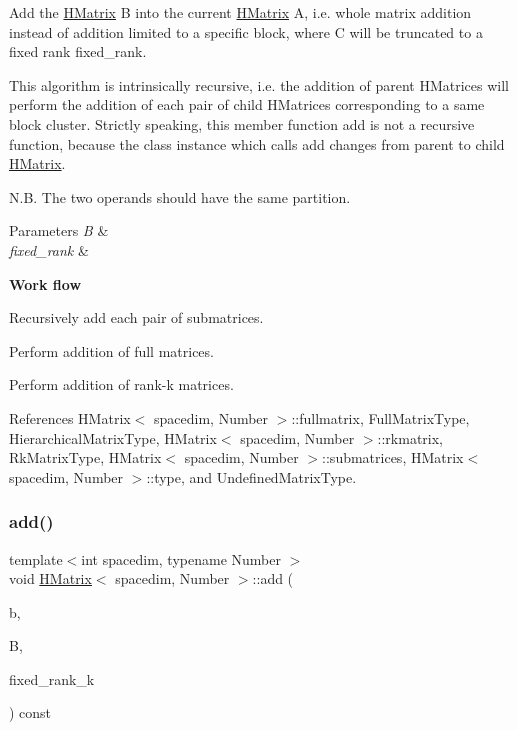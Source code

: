 Add the \hyperlink{classHMatrix}{H\+Matrix} {\ttfamily B} into the current \hyperlink{classHMatrix}{H\+Matrix} {\ttfamily A}, i.\+e. whole matrix addition instead of addition limited to a specific block, where {\ttfamily C} will be truncated to a fixed rank {\ttfamily fixed\+\_\+rank}.

This algorithm is intrinsically recursive, i.\+e. the addition of parent H\+Matrices will perform the addition of each pair of child H\+Matrices corresponding to a same block cluster. Strictly speaking, this member function {\ttfamily add} is not a recursive function, because the class instance which calls {\ttfamily add} changes from parent to child \hyperlink{classHMatrix}{H\+Matrix}.

N.\+B. The two operands should have the same partition.


\begin{DoxyParams}{Parameters}
{\em B} & \\
\hline
{\em fixed\+\_\+rank} & \\
\hline
\end{DoxyParams}
{\bfseries Work flow}

Recursively add each pair of submatrices.

Perform addition of full matrices.

Perform addition of rank-\/k matrices.

References H\+Matrix$<$ spacedim, Number $>$\+::fullmatrix, Full\+Matrix\+Type, Hierarchical\+Matrix\+Type, H\+Matrix$<$ spacedim, Number $>$\+::rkmatrix, Rk\+Matrix\+Type, H\+Matrix$<$ spacedim, Number $>$\+::submatrices, H\+Matrix$<$ spacedim, Number $>$\+::type, and Undefined\+Matrix\+Type.

\mbox{\label{classHMatrix_af42aaa86b9f47c5c1514e4f06e343db6}} 
\subsubsection{\texorpdfstring{add()}{add()}\hspace{0.1cm}{\footnotesize\ttfamily [4/10]}}
{\footnotesize\ttfamily template$<$int spacedim, typename Number $>$ \\
void \hyperlink{classHMatrix}{H\+Matrix}$<$ spacedim, Number $>$\+::add (\begin{DoxyParamCaption}\item[{const Number}]{b,  }\item[{const \hyperlink{classHMatrix}{H\+Matrix}$<$ spacedim, Number $>$ \&}]{B,  }\item[{const \hyperlink{classHMatrix_a5ca8dc549783d38371a01ecd621ecb34}{size\+\_\+type}}]{fixed\+\_\+rank\+\_\+k }\end{DoxyParamCaption}) const}

